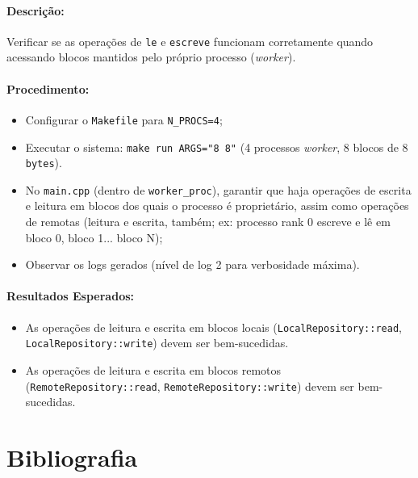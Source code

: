 \documentclass[12pt]{article}
\begin{document}
\paragraph{Descrição:} Verificar se as operações de \texttt{le} e \texttt{escreve} funcionam corretamente quando
acessando blocos mantidos pelo próprio processo (\textit{worker}).

\paragraph{Procedimento:}
\begin{itemize}
  \item Configurar o \texttt{Makefile} para \texttt{N\_PROCS=4};
  \item Executar o sistema: \texttt{make run ARGS="8 8"} (4 processos \textit{worker}, 8 blocos de 8 \texttt{bytes}).
  \item No \texttt{main.cpp} (dentro de \texttt{worker\_proc}), garantir que haja operações de escrita e leitura em
    blocos dos quais o processo é proprietário, assim como operações de remotas (leitura e escrita, também; ex: processo
    rank 0 escreve e lê em bloco 0, bloco 1... bloco N);
  \item Observar os logs gerados (nível de log 2 para verbosidade máxima).
\end{itemize}

\paragraph{Resultados Esperados:}
\begin{itemize}
  \item As operações de leitura e escrita em blocos locais (\texttt{LocalRepository::read}, \texttt{LocalRepository::write}) devem ser bem-sucedidas.
  \item As operações de leitura e escrita em blocos remotos (\texttt{RemoteRepository::read}, \texttt{RemoteRepository::write}) devem ser bem-sucedidas.
\end{itemize}

\newpage
\section{Bibliografia}


\end{document}
